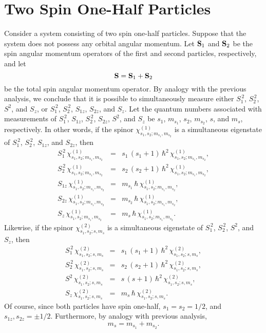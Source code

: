 \section{Two Spin One-Half Particles}\label{shalf}
Consider a system consisting of two spin one-half particles. Suppose
that the system does not possess any orbital angular momentum. 
Let ${\bf S}_1$ and ${\bf S}_2$ be the spin angular momentum operators
of the first and second particles, respectively, and let
\begin{equation}
{\bf S} ={\bf S}_1 + {\bf S}_2
\end{equation}
be the total spin angular momentum operator. By analogy
with the previous analysis, we conclude that it is possible to simultaneously measure either
$S_1^{\,2}$, $S_2^{\,2}$, $S^2$, and $S_z$, or
$S_1^{\,2}$, $S_2^{\,2}$, $S_{1z}$, $S_{2z}$, and $S_z$. 
Let the quantum numbers associated with measurements of
$S_1^{\,2}$, $S_{1z}$, $S_2^{\,2}$, $S_{2z}$, $S^2$, and 
$S_z$ be $s_1$, $m_{s_1}$, $s_2$, $m_{s_2}$, $s$, and $m_s$, respectively.
In other words, if the spinor $\chi_{s_1,s_2;m_{s_1},m_{s_2}}^{(1)}$ is
a simultaneous eigenstate of $S_1^{\,2}$, $S_2^{\,2}$, $S_{1z}$,
and $S_{2z}$, then
\begin{eqnarray}
S_1^{\,2}\, \chi_{s_1,s_2;m_{s_1},m_{s_2}}^{(1)}&=& s_1\,(s_1+1)\,\hbar^2
\,\chi_{s_1,s_2;m_{s_1},m_{s_2}}^{(1)},\\[0.5ex]
S_2^{\,2}\, \chi_{s_1,s_2;m_{s_1},m_{s_2}}^{(1)}&=& s_2\,(s_2+1)\,\hbar^2
\,\chi_{s_1,s_2;m_{s_1},m_{s_2}}^{(1)},\\[0.5ex]
S_{1z}\, \chi_{s_1,s_2;m_{s_1},m_{s_2}}^{(1)}&=& m_{s_1}\,\hbar
\,\chi_{s_1,s_2;m_{s_1},m_{s_2}}^{(1)},\\[0.5ex]
S_{2z}\, \chi_{s_1,s_2;m_{s_1},m_{s_2}}^{(1)}&=& m_{s_2}\,\hbar
\,\chi_{s_1,s_2;m_{s_1},m_{s_2}}^{(1)},\\[0.5ex]
S_z\, \chi_{s_1,s_2;m_{s_1},m_{s_2}}^{(1)}&=& m_s\,\hbar
\,\chi_{s_1,s_2;m_{s_1},m_{s_2}}^{(1)}.
\end{eqnarray}
Likewise, if the spinor $\chi_{s_1,s_2;s,m_s}^{(2)}$ is
a simultaneous eigenstate of $S_1^{\,2}$, $S_2^{\,2}$, $S^2$,
and $S_z$, then
\begin{eqnarray}
S_1^{\,2}\, \chi_{s_1,s_2;s,m_s}^{(2)}&=& s_1\,(s_1+1)\,\hbar^2
\,\chi_{s_1,s_2;s,m_s}^{(2)},\\[0.5ex]
S_2^{\,2}\, \chi_{s_1,s_2;s,m_s}^{(2)}&=& s_2\,(s_2+1)\,\hbar^2
\,\chi_{s_1,s_2;s,m_s}^{(2)},\\[0.5ex]
S^{2}\, \chi_{s_1,s_2;s,m_s}^{(2)}&=& s\,(s+1)\,\hbar^2
\,\chi_{s_1,s_2;s,m_s}^{(2)},\\[0.5ex]
S_z\, \chi_{s_1,s_2;s,m_s}^{(2)}&=& m_s\,\hbar
\,\chi_{s_1,s_2;s,m_s}^{(2)}.
\end{eqnarray}
Of course, since both particles have spin one-half, $s_1=s_2=1/2$, and
$s_{1z}, s_{2z}=\pm 1/2$. Furthermore, by analogy with previous
analysis,
\begin{equation}
m_s = m_{s_1}+ m_{s_2}.
\end{equation}

